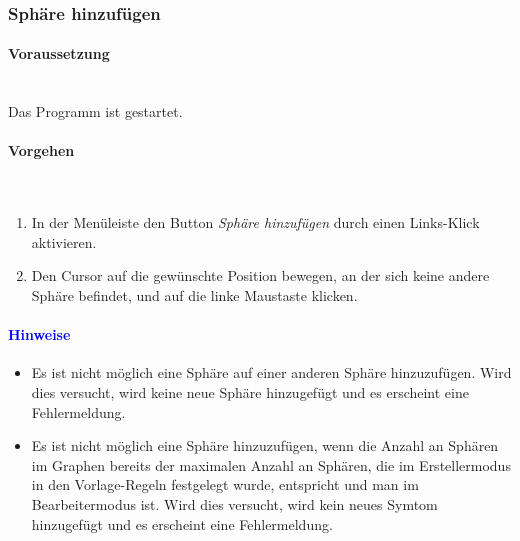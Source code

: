 \documentclass[enabledeprecatedfontcommands,fontsize=11pt,paper=a4,twoside]{scrartcl}
\newcommand*{\hint}{\paragraph{\textcolor{blue}{Hinweise}}}
\newcommand*{\condition}{\paragraph{Voraussetzung}$\;$ \vspace{0.2cm}\\}
\newcommand*{\actions}{\paragraph{Vorgehen} $\;$\vspace{0.2cm}\\}
\begin{document}
		\subsubsection{Sphäre hinzufügen}	
		\condition 	
		Das Programm ist gestartet.
		\actions
		\begin{enumerate}
			\item In der Menüleiste den Button \textit{Sphäre hinzufügen} durch einen Links-Klick aktivieren.
			\item Den Cursor auf die gewünschte Position bewegen, an der sich keine andere Sphäre befindet, und auf die linke Maustaste klicken.
		\end{enumerate}
		\hint
		\begin{itemize}
			\item Es ist nicht möglich eine Sphäre auf einer anderen Sphäre hinzuzufügen. Wird dies versucht, wird keine neue Sphäre hinzugefügt und es erscheint eine Fehlermeldung.
	\item Es ist nicht möglich eine Sphäre hinzuzufügen, wenn die Anzahl an Sphären im Graphen bereits der maximalen Anzahl an Sphären, die im Erstellermodus in den Vorlage-Regeln festgelegt wurde, entspricht und man im Bearbeitermodus ist. Wird dies versucht, wird kein neues Symtom hinzugefügt und es erscheint eine Fehlermeldung.
	\end{itemize}
\end{document}

